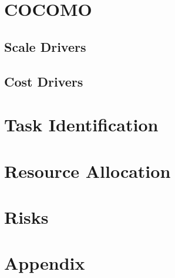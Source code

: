 \documentclass[12pt, a4paper]{article}
\begin{document}
    \newpage
    \section{COCOMO}
        
        
        \subsection{Scale Drivers}
        
        
        \subsection{Cost Drivers}
        
    
    \newpage
    \section{Task Identification}
        

    \newpage
    \section{Resource Allocation}
        

    \newpage
    \section{Risks}
        
    
    \newpage
    \section*{Appendix}
    	
\end{document}
